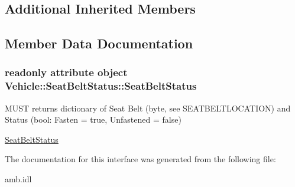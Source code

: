 \subsection*{Additional Inherited Members}


\subsection{Member Data Documentation}
\hypertarget{interfaceVehicle_1_1SeatBeltStatus_a88d4017d671010ab66ca424a5e4977f2}{
\subsubsection[{Seat\-Belt\-Status}]{\setlength{\rightskip}{0pt plus 5cm}readonly attribute object Vehicle\-::\-Seat\-Belt\-Status\-::\-Seat\-Belt\-Status}}\label{interfaceVehicle_1_1SeatBeltStatus_a88d4017d671010ab66ca424a5e4977f2}


M\-U\-S\-T returns dictionary of Seat Belt (byte, see S\-E\-A\-T\-B\-E\-L\-T\-L\-O\-C\-A\-T\-I\-O\-N) and Status (bool\-: Fasten = true, Unfastened = false) 

\hyperlink{interfaceVehicle_1_1SeatBeltStatus}{Seat\-Belt\-Status} 

The documentation for this interface was generated from the following file\-:\begin{DoxyCompactItemize}
\item 
amb.\-idl\end{DoxyCompactItemize}
